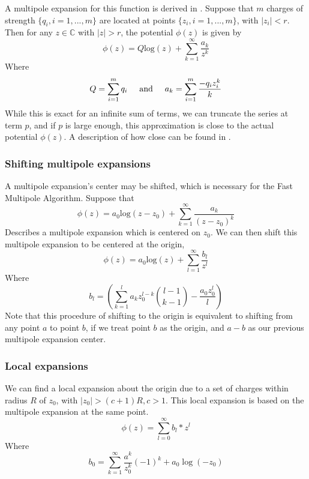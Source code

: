 \documentclass[pdftex,twoside,a4paper]{report}
\newcommand{\hs}{$\hspace{0.5cm}$}
\newcommand{\fma}{Fast Multipole Algorithm}
\begin{document}
A multipole expansion for this function is derived in \cite{greengard:315}. Suppose that $m$ charges of strength $\{q_i,i=1,...,m\}$ are located at points $\{z_i, i=1,...,m\}$, with $|z_i| < r$. Then for any $z \in \mathbb{C}$ with $|z| > r$, the potential $\phi(z)$ is given by
\begin{equation}
\phi(z) = Q \text{log}(z) + \sum_{k=1} ^{\infty} \frac{a_k}{z^k}
\label{eq:multipole_expansion}
\end{equation}
Where
\begin{equation}
Q = \sum_{i=1} ^m q_i 
\hspace{0.5cm} \text{and} \hspace{0.5cm}
a_k = \sum_{i=1} ^m \frac{-q_i z^k _i}{k}
\end{equation}
While this is exact for an infinite sum of terms, we can truncate the series at term $p$, and if $p$ is large enough, this approximation is close to the actual potential $\phi(z)$. A description of how close can be found in \cite{greengard:315}.
\subsubsection{Shifting multipole expansions}
A multipole expansion's center may be shifted, which is necessary for the \fma{}. Suppose that
\begin{equation}
\phi(z) = a_0 \text{log}(z-z_0) + \sum_{k=1} ^{\infty} \frac{a_k}{(z-z_0)^k}
\label{eq:pre_shift_multipole}
\end{equation}
Describes a multipole expansion which is centered on $z_0$. We can then shift this multipole expansion to be centered at the origin,
\begin{equation}
\phi(z) = a_0 \text{log}(z) + \sum_{l=1} ^{\infty} \frac{b_l}{z^l}
\label{eq:shifted_multipole}
\end{equation}
Where
\begin{equation}
b_l = \left(\sum_{k=1} ^l a_k z_0^{l-k} \binom{l-1}{k-1} - \frac{a_0 z_0^l}{l} \right)
\label{eq:b_descr}
\end{equation}
Note that this procedure of shifting to the origin is equivalent to shifting from any point $a$ to point $b$, if we treat point $b$ as the origin, and $a-b$ as our previous multipole expansion center.
\subsubsection{Local expansions}
We can find a local expansion about the origin due to a set of charges within radius $R$ of $z_0$, with $|z_0| > (c+1)R, \hs c > 1$. This local expansion is based on the multipole expansion at the same point.
\begin{equation}
\phi(z) = \sum _{l=0} ^{\infty} b_l * z^l
\label{local_expansion}
\end{equation}
Where
\begin{equation}
b_0 = \sum_{k=1} ^{\infty} \frac{a^k}{z^k_0} (-1)^k + a_0 \log(-z_0)
\label{where_local_expansion}
\end{equation}
\end{document}
